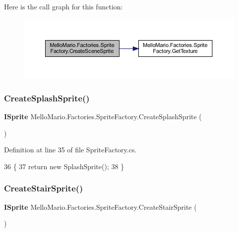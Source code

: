 Here is the call graph for this function\+:
\nopagebreak
\begin{figure}[H]
\begin{center}
\leavevmode
\includegraphics[width=350pt]{classMelloMario_1_1Factories_1_1SpriteFactory_a778377c0e6784f9279f14bdbd08c115c_cgraph}
\end{center}
\end{figure}
\mbox{\label{classMelloMario_1_1Factories_1_1SpriteFactory_a4592c8c43a9f3c4a5258de04c5e05421}} 
\subsubsection{Create\+Splash\+Sprite()}
{\footnotesize\ttfamily \textbf{ I\+Sprite} Mello\+Mario.\+Factories.\+Sprite\+Factory.\+Create\+Splash\+Sprite (\begin{DoxyParamCaption}{ }\end{DoxyParamCaption})}



Definition at line 35 of file Sprite\+Factory.\+cs.


\begin{DoxyCode}
36         \{
37             \textcolor{keywordflow}{return} \textcolor{keyword}{new} SplashSprite();
38         \}
\end{DoxyCode}
\mbox{\label{classMelloMario_1_1Factories_1_1SpriteFactory_a24b3d1609a17a13a3122f6dae1a67fcd}} 
\subsubsection{Create\+Stair\+Sprite()}
{\footnotesize\ttfamily \textbf{ I\+Sprite} Mello\+Mario.\+Factories.\+Sprite\+Factory.\+Create\+Stair\+Sprite (\begin{DoxyParamCaption}{ }\end{DoxyParamCaption})}




